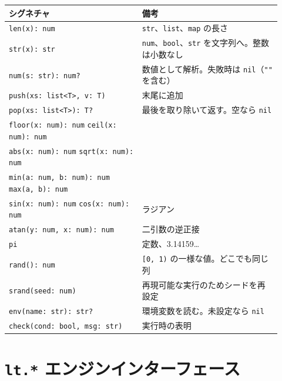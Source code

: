 \begin{center}
\small\begin{tabular}{@{}p{0.45\linewidth}p{0.47\linewidth}@{}}
\toprule
\textbf{シグネチャ} & \textbf{備考} \\
\midrule
\texttt{len(x): num} & \texttt{str}、\texttt{list}、\texttt{map} の長さ \\
\texttt{str(x): str} & \texttt{num}、\texttt{bool}、\texttt{str} を文字列へ。整数は小数なし \\
\texttt{num(s: str): num?} & 数値として解析。失敗時は \texttt{nil}（\texttt{""} を含む） \\
\texttt{push(xs: list<T>, v: T)} & 末尾に追加 \\
\texttt{pop(xs: list<T>): T?} & 最後を取り除いて返す。空なら \texttt{nil} \\
\midrule
\texttt{floor(x: num): num} \enskip \texttt{ceil(x: num): num} & \\
\texttt{abs(x: num): num} \enskip \texttt{sqrt(x: num): num} & \\
\texttt{min(a: num, b: num): num} \enskip \texttt{max(a, b): num} & \\
\texttt{sin(x: num): num} \enskip \texttt{cos(x: num): num} & ラジアン \\
\texttt{atan(y: num, x: num): num} & 二引数の逆正接 \\
\texttt{pi} & 定数、3.14159\ldots \\
\midrule
\texttt{rand(): num} & \texttt{[0, 1)} の一様な値。どこでも同じ列 \\
\texttt{srand(seed: num)} & 再現可能な実行のためシードを再設定 \\
\texttt{env(name: str): str?} & 環境変数を読む。未設定なら \texttt{nil} \\
\texttt{check(cond: bool, msg: str)} & 実行時の表明 \\
\bottomrule
\end{tabular}
\end{center}

\section*{\texttt{lt.*} エンジンインターフェース}

